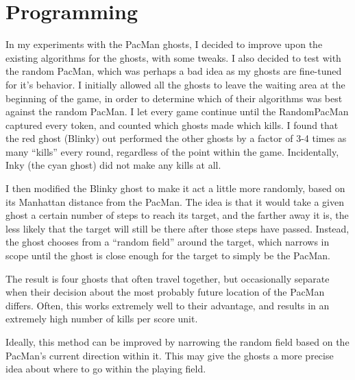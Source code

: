 \documentclass{article}
\begin{document}
\newpage

\section*{Programming}

In my experiments with the PacMan ghosts, I decided to improve upon the existing algorithms for the ghosts, with some tweaks. I also decided to test with the random PacMan, which was perhaps a bad idea as my ghosts are fine-tuned for it's behavior. I initially allowed all the ghosts to leave the waiting area at the beginning of the game, in order to determine which of their algorithms was best against the random PacMan. I let every game continue until the RandomPacMan captured every token, and counted which ghosts made which kills. I found that the red ghost (Blinky) out performed the other ghosts by a factor of 3-4 times as many ``kills'' every round, regardless of the point within the game. Incidentally, Inky (the cyan ghost) did not make any kills at all.

I then modified the Blinky ghost to make it act a little more randomly, based on its Manhattan distance from the PacMan. The idea is that it would take a given ghost a certain number of steps to reach its target, and the farther away it is, the less likely that the target will still be there after those steps have passed. Instead, the ghost chooses from a ``random field'' around the target, which narrows in scope until the ghost is close enough for the target to simply be the PacMan.

The result is four ghosts that often travel together, but occasionally separate when their decision about the most probably future location of the PacMan differs. Often, this works extremely well to their advantage, and results in an extremely high number of kills per score unit.

Ideally, this method can be improved by narrowing the random field based on the PacMan's current direction within it. This may give the ghosts a more precise idea about where to go within the playing field.
\end{document}
